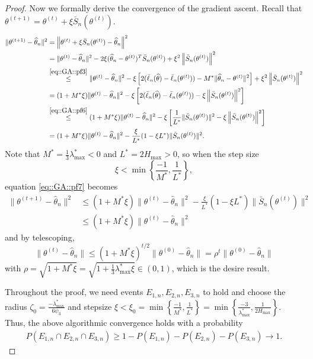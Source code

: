 \documentclass[aos, preprint]{imsart}
\theoremstyle{plain}
\theoremstyle{definition}
\let\hat\widehat
\begin{document}
\begin{appendix}
\begin{proof}
Now we formally derive the convergence of the gradient ascent. 
Recall that $\theta^{(t+1)} = \theta^{(t)} + \xi \bar S_n(\theta^{(t)})$. 
\begin{equation}
\begin{aligned}
\|\theta^{(t+1)} - \hat \theta_n\|^2 &=  \left\|\theta^{(t)} + \xi\bar S_n(\theta^{(t)}) - \hat \theta_n\right\|^2\\
& = \|\theta^{(t)} - \hat \theta_n\|^2 - 2\xi  (\hat \theta_n-\theta^{(t)} )^T \bar S_n(\theta^{(t)}) + \xi^2 \left\|\bar S_n(\theta^{(t)})\right\|^2\\
&\overset{\eqref{eq::GA::pf3}}{\leq }\|\theta^{(t)} - \hat \theta_n\|^2 - \xi\left[2(\bar \ell_n(\hat \theta) - \bar \ell_n(\theta^{(t)})) - M^*\|\hat \theta_n - \theta^{(t)}\|^2\right] + \xi^2 \left\|\bar S_n(\theta^{(t)})\right\|^2\\
& = (1+M^*\xi) \|\theta^{(t)} - \hat \theta_n\|^2  -\xi \left[2(\bar \ell_n(\hat \theta) - \bar \ell_n(\theta^{(t)})) - \xi \left\|\bar S_n(\theta^{(t)})\right\|^2\right]\\
&\overset{\eqref{eq::GA::pf6}}{\leq }
(1+M^*\xi) \|\theta^{(t)} - \hat \theta_n\|^2  -\xi \left[\frac{1}{L^*} \|\bar S_n(\theta^{(t)})\|^2- \xi \left\|\bar S_n(\theta^{(t)})\right\|^2\right]\\
& = (1+M^*\xi) \|\theta^{(t)} - \hat \theta_n\|^2 - \frac{\xi}{L^*} (1- \xi L^*) \|\bar S_n(\theta^{(t)})\|^2.
\end{aligned}
\label{eq::GA::pf7}
\end{equation}
Note that $M^* = \frac{1}{3}\lambda^*_{\max}<0$ and $L^* = 2 H_{\max}>0$,
so when the step size 
$$
\xi < \min\left\{\frac{-1}{M^*}, \frac{1}{L^*}\right\}, 
$$
equation \eqref{eq::GA::pf7} becomes
\begin{align*}
\|\theta^{(t+1)} - \hat \theta_n\|^2 &\leq (1+M^*\xi) \|\theta^{(t)} - \hat \theta_n\|^2 - \frac{\xi}{L^*} (1- \xi L^*) \|\bar S_n(\theta^{(t)})\|^2\\
&\leq 
(1+M^*\xi) \|\theta^{(t)} - \hat \theta_n\|^2 
\end{align*}
and by telescoping, 
$$
\|\theta^{(t)} - \hat \theta_n\| \leq (1+M^*\xi)^{t/2} \|\theta^{(0)} - \hat \theta_n\| = \rho^t  \|\theta^{(0)} - \hat \theta_n\|
$$
with $\rho =\sqrt{1+M^*\xi} = \sqrt{1+\frac{1}{3}\lambda^*_{\max}\xi}\in(0,1)$, which is the desire result.

Throughout the proof, we need events $E_{1,n}, E_{2,n}, E_{3,n}$ to hold
and choose the radius $\zeta_0 = \frac{-\lambda^*_{\max}}{6\psi_3} $ and stepsize $\xi < \xi_0 = \min\left\{\frac{-1}{M^*}, \frac{1}{L^*}\right\} = \min\left\{\frac{-3}{\lambda^*_{\max}}, \frac{1}{2H_{\max}}\right\}$. 
Thus, the above algorithmic convergence holds with a probability 
\begin{align*}
P(E_{1,n}\cap E_{2,n}\cap E_{3,n}) \geq 1- P(E_{1,n}) - P(E_{2,n}) - P(E_{3,n}) \rightarrow 1.
\end{align*}


\end{proof}
\end{appendix}
\end{document}
